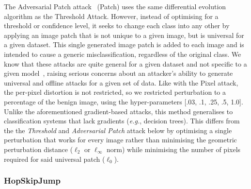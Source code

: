 The Adversarial Patch attack~\cite{adversarialpatch} (Patch) uses the same differential evolution algorithm as the Threshold Attack.
However, instead of optimising for a threshold or confidence level, it seeks to change each class into any other by applying an image patch that is not unique to a given image, but is universal for a  given dataset.
This single generated image patch is added to each image and is intended to cause a generic misclassification, regardless of the original class.
We know that these attacks are quite general for a given dataset and not specific to a given model~\cite{adversarialpatch,xiao2021improving}, raising serious concerns about an attacker's ability to generate universal and offline attacks for a given set of data.
Like with the Pixel attack, the per-pixel distortion is not restricted, so we restricted perturbation to a percentage of the benign image, using the hyper-parameters [.03, .1, .25, .5, 1.0].
Unlike the aforementioned gradient-based attacks, this method generalises to classification systems that lack gradients (\textit{e.g.}, decision trees).
This differs from the the \textit{Threshold} and \textit{Adversarial Patch} attack below by optimising a single perturbation that works for every image rather than minimising the geometric perturbation distance ($\ell_2$ or $\ell_{\infty}$ norm) while minimising the number of pixels required for said universal patch ($\ell_0$).

\subsubsection{HopSkipJump}

